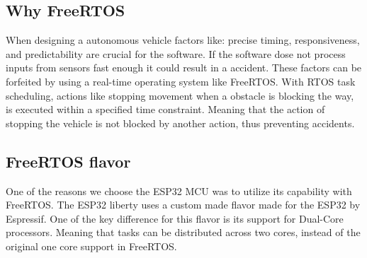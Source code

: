 \documentclass[../report.tex]{subfiles}
\begin{document}
    \subsection{Why FreeRTOS}
    When designing a autonomous vehicle factors like: precise timing,
    responsiveness, and predictability are crucial for the software.
    If the software dose not process inputs from sensors fast enough it could
    result in a accident. These factors can be forfeited by using a real-time
    operating system like FreeRTOS. With RTOS task scheduling, actions like
    stopping movement when a obstacle is blocking the way, is executed within a
    specified time constraint. Meaning that the action of stopping the vehicle
    is not blocked by another action, thus preventing accidents.

    \subsection{FreeRTOS flavor}
    One of the reasons we choose the ESP32 MCU was to utilize its capability
    with FreeRTOS. The ESP32 liberty uses a custom made flavor made for the
    ESP32 by Espressif. One of the key difference for this flavor is its
    support for Dual-Core processors. Meaning that tasks can be distributed
    across two cores, instead of the original one core support in FreeRTOS.
\end{document}
